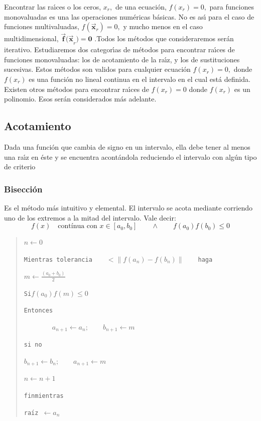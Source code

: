 \documentclass[spanish,titlepage,11pt]{article}
\begin{document}
Encontrar las ra\'{\i}ces o los ceros, $x_{r},$ de una ecuaci\'{o}n,
$f(x_{r})=0,$ para funciones monovaluadas es una las operaciones num\'{e}ricas
b\'{a}sicas. No es as\'{\i} para el caso de funciones multivaluadas,
$f(\mathbf{\vec{x}}_{r})=0,$ y mucho menos en el caso multidimensional,
$\mathbf{\vec{f}(\vec{x}}_{r}\mathbf{)=0}$ .Todos los m\'{e}todos que
consideraremos ser\'{a}n iterativo. Estudiaremos dos categor\'{\i}as de
m\'{e}todos para encontrar ra\'{\i}ces de funciones monovaluadas: los de
acotamiento de la ra\'{\i}z, y los de sustituciones sucesivas. Estos
m\'{e}todos son validos para cualquier ecuaci\'{o}n $f(x_{r})=0,$ donde
$f(x_{r})$ es una funci\'{o}n no lineal continua en el intervalo en el cual
est\'{a} definida. Existen otros m\'{e}todos para encontrar ra\'{\i}ces de
$f(x_{r})=0$ donde $f(x_{r})$ es un polinomio. Esos ser\'{a}n considerados
m\'{a}s adelante.

\subsection{Acotamiento}

Dada una funci\'{o}n que cambia de signo en un intervalo, ella debe tener al
menos una ra\'{\i}z en \'{e}ste y se encuentra acont\'{a}ndola reduciendo el
intervalo con alg\'{u}n tipo de criterio

\subsubsection{Bisecci\'{o}n}

Es el m\'{e}todo m\'{a}s intuitivo y elemental. El intervalo se acota mediante
corriendo uno de los extremos a la mitad del intervalo. Vale decir:
\[
f(x)\quad\text{cont\'{i}nua con }x\in\left[  a_{0},b_{0}\right]  \qquad
\wedge\qquad f(a_{0})f(b_{0})\leqslant0
\]

\begin{quotation}
$n\leftarrow0$

\texttt{Mientras tolerancia}$\qquad<\left\|  f(a_{n})-f(b_{n})\right\|
\qquad$\texttt{haga}

\texttt{\qquad}$m\leftarrow\frac{(a_{0}+b_{0})}{2}$

\texttt{\qquad Si\qquad}$f(a_{0})f(m)\leqslant0$

\texttt{\qquad Entonces}

$\qquad\qquad a_{n+1}\leftarrow a_{n};\qquad b_{n+1}\leftarrow m$

\texttt{\qquad si no}

\texttt{\qquad\qquad}$b_{n+1}\leftarrow b_{n};\qquad a_{n+1}\leftarrow m$

\qquad$n\leftarrow n+1$

\texttt{finmientras}

\texttt{ra\'{\i}z\ }$\leftarrow a_{n}$
\end{quotation}
\end{document}
